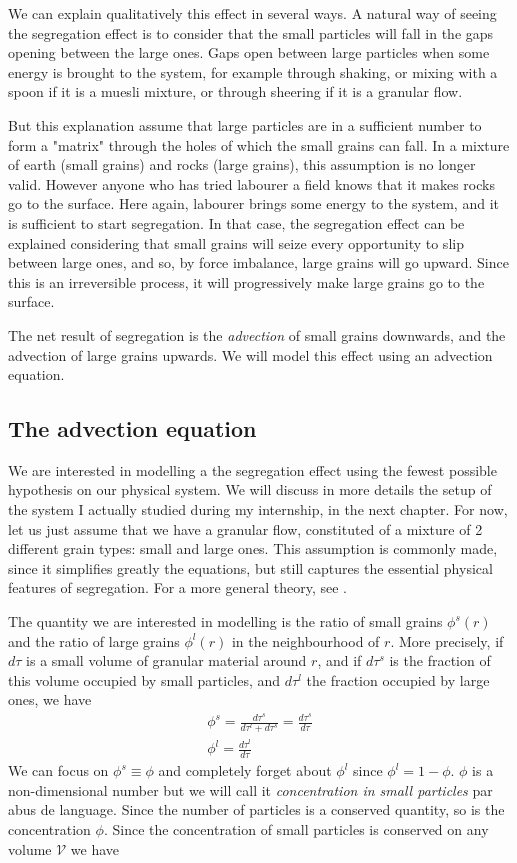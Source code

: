 \documentclass[11pt,a4paper]{report}
\begin{document}
We can explain qualitatively this effect in several ways. A natural way of seeing the segregation effect is to consider that the small particles will fall in the gaps opening between the large ones. Gaps open between large particles when some energy is brought to the system, for example through shaking, or mixing with a spoon if it is a muesli mixture, or through sheering if it is a granular flow.

But this explanation assume that large particles are in a sufficient number to form a "matrix" through the holes of which the small grains can fall. 
In a mixture of earth (small grains) and rocks (large grains), this assumption is no longer valid. However anyone who has tried labourer a field knows that it makes rocks go to the surface. Here again, labourer brings some energy to the system, and it is sufficient to start segregation. 
In that case, the segregation effect can be explained considering that small grains will seize every opportunity to slip between large ones, and so, by force imbalance, large grains will go upward. Since this is an irreversible process, it will progressively make large grains go to the surface.

The net result of segregation is the \textit{advection} of small grains downwards, and the advection of large grains upwards. We will model this effect using an advection equation.

\subsection{The advection equation}

We are interested in modelling a the segregation effect using the fewest possible hypothesis on our physical system. We will discuss in more details the setup of the system I actually studied during my internship, in the next chapter. 
For now, let us just assume that we have a granular flow, constituted of a mixture of 2 different grain types: small and large ones. This assumption is commonly made, since it simplifies greatly the equations, but still captures the essential physical features of segregation. For a more general theory, see \cite{3phase}.

The quantity we are interested in modelling is the ratio of small grains $\phi^s(r)$ and the ratio of large grains $\phi^l(r)$ in the neighbourhood of $r$. More precisely, if $d\tau$ is a small volume of granular material around $r$, and if $d\tau^s$ is the fraction of this volume occupied by small particles, and $d\tau^l$ the fraction occupied by large ones, we have
\begin{align}
	\phi^s = \frac{d\tau^s}{d\tau^l + d\tau^s} = \frac{d\tau^s}{d\tau }\\
	\phi^l = \frac{d\tau^l}{d\tau}
\end{align}
We can focus on $\phi^s \equiv \phi$ and completely forget about $\phi^l$ since $\phi^l = 1 - \phi$. $\phi$ is a non-dimensional number but we will call it \textit{concentration in small particles} par abus de language.
Since the number of particles is a conserved quantity, so is the concentration $\phi$. Since the concentration of small particles is conserved on any volume $\mathcal{V}$ we have
\end{document}
